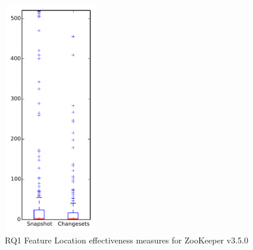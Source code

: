 
\begin{figure}[t]
\centering
\includegraphics[width=0.36\textwidth]{figures/flt/rq1_zookeeper}
\caption{RQ1 Feature Location effectiveness measures for ZooKeeper v3.5.0}
\label{fig:flt:rq1:zookeeper}
\end{figure}
